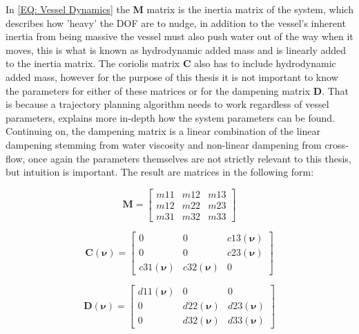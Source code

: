 In \ref{EQ: Vessel Dynamics} the \textbf{M} matrix is the inertia matrix of the system, which describes how 'heavy' the \gls{DOF} are to nudge, in
addition to the vessel's inherent inertia from being massive the vessel must also push water out of the way when it moves, this is what is known as
hydrodynamic added mass and is linearly added to the inertia matrix. The coriolis matrix \textbf{C} also has to include hydrodynamic added mass,
however for the purpose of this thesis it is not important to know the parameters for either of these matrices or for the dampening matrix \textbf{D}.
That is because a trajectory planning algorithm needs to work regardless of vessel parameters, \cite{pedersen2019optimization} explains more in-depth
how the system parameters can be found. Continuing on, the dampening matrix is a linear combination of the linear dampening stemming from water
viscosity and non-linear dampening from cross-flow, once again the parameters themselves are not strictly relevant to this thesis, but intuition is
important. The result are matrices in the following form:

\begin{equation}
    \textbf{M} = \begin{bmatrix}
                m11 &   m12 &   m13\\[-5pt]
                m12 &   m22 &   m23\\[-5pt]
                m31 &   m32 &   m33
                 \end{bmatrix}
\end{equation}

\begin{equation}
    \textbf{C}(\bm{\nu}) =  \begin{bmatrix}
        0             &     0       &   c13(\bm{\nu})\\[-5pt]
        0             &     0       &   c23(\bm{\nu})\\[-5pt]
        c31(\bm{\nu}) &c32(\bm{\nu})&   0
                            \end{bmatrix}    
\end{equation}

\begin{equation}
    \textbf{D}(\bm{\nu}) =  \begin{bmatrix}
        d11(\bm{\nu}) &     0       &   0\\[-5pt]
        0             &d22(\bm{\nu})&d23(\bm{\nu})\\[-5pt]
        0             &d32(\bm{\nu})&d33(\bm{\nu})
                            \end{bmatrix}       
\end{equation}


